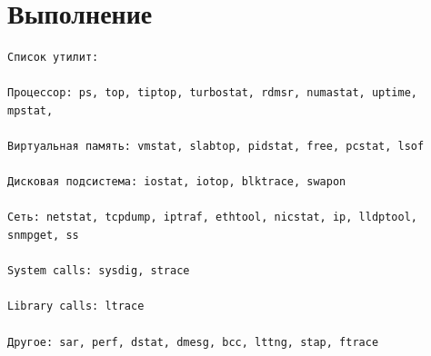 \documentclass[11pt, a4paper]{article}
\begin{document}
\section{Выполнение}

\begin{Verbatim}[fontsize=\small]
Список утилит:

Процессор: ps, top, tiptop, turbostat, rdmsr, numastat, uptime, mpstat,

Виртуальная память: vmstat, slabtop, pidstat, free, pcstat, lsof

Дисковая подсистема: iostat, iotop, blktrace, swapon

Сеть: netstat, tcpdump, iptraf, ethtool, nicstat, ip, lldptool, snmpget, ss

System calls: sysdig, strace

Library calls: ltrace

Другое: sar, perf, dstat, dmesg, bcc, lttng, stap, ftrace

\end{Verbatim}
\end{document}
